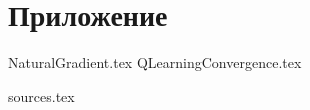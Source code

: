 \documentclass[a4paper, 10pt, oneside]{memoir}
\begin{document}


\newpage
\tableofcontents*











\newpage

\appendix

\chapter{Приложение}

{NaturalGradient.tex}
{QLearningConvergence.tex}

{sources.tex}
\end{document}
